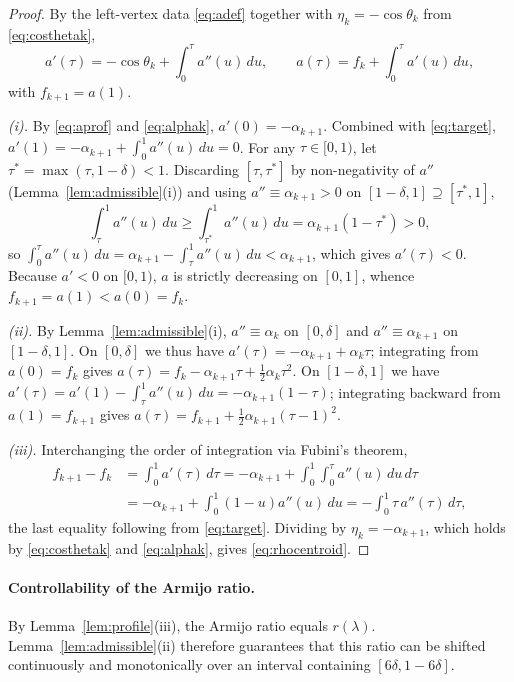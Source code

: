 \documentclass[11pt]{article}
\begin{document}
\begin{proof}
By the left-vertex data \eqref{eq:adef} together with $\eta_k=-\cos\theta_k$ from \eqref{eq:costhetak},
\begin{equation}
\label{eq:aprof}
a'(\tau) = -\cos\theta_k + \int_0^\tau a''(u)\,du, \qquad
a(\tau) = f_k + \int_0^\tau a'(u)\,du,
\end{equation}
with $f_{k+1}=a(1)$.

\emph{(i).} By \eqref{eq:aprof} and \eqref{eq:alphak}, $a'(0)=-\alpha_{k+1}$. Combined with \eqref{eq:target}, $a'(1)=-\alpha_{k+1}+\int_0^1 a''(u)\,du=0$. For any $\tau\in[0,1)$, let $\tau^*=\max(\tau,1-\delta)<1$. Discarding $[\tau,\tau^*]$ by non-negativity of $a''$ (Lemma~\ref{lem:admissible}(i)) and using $a''\equiv\alpha_{k+1}>0$ on $[1-\delta,1]\supseteq[\tau^*,1]$,
\[
\int_\tau^1 a''(u)\,du \ge \int_{\tau^*}^1 a''(u)\,du = \alpha_{k+1}(1-\tau^*) > 0,
\]
so $\int_0^\tau a''(u)\,du = \alpha_{k+1} - \int_\tau^1 a''(u)\,du < \alpha_{k+1}$, which gives $a'(\tau)<0$. Because $a'<0$ on $[0,1)$, $a$ is strictly decreasing on $[0,1]$, whence $f_{k+1}=a(1)<a(0)=f_k$.

\emph{(ii).} By Lemma~\ref{lem:admissible}(i), $a''\equiv\alpha_k$ on $[0,\delta]$ and $a''\equiv\alpha_{k+1}$ on $[1-\delta,1]$. On $[0,\delta]$ we thus have $a'(\tau)=-\alpha_{k+1}+\alpha_k\tau$; integrating from $a(0)=f_k$ gives $a(\tau)=f_k-\alpha_{k+1}\tau+\tfrac12\alpha_k\tau^2$. On $[1-\delta,1]$ we have $a'(\tau)=a'(1)-\int_\tau^1 a''(u)\,du=-\alpha_{k+1}(1-\tau)$; integrating backward from $a(1)=f_{k+1}$ gives $a(\tau)=f_{k+1}+\tfrac12\alpha_{k+1}(\tau-1)^2$.

\emph{(iii).} Interchanging the order of integration via Fubini's theorem,
\begin{align*}
f_{k+1}-f_k
&=\int_0^1 a'(\tau)\,d\tau
=-\alpha_{k+1}+\int_0^1\!\!\int_0^\tau a''(u)\,du\,d\tau \\
&=-\alpha_{k+1}+\int_0^1(1-u)a''(u)\,du
=-\int_0^1\tau\,a''(\tau)\,d\tau,
\end{align*}
the last equality following from \eqref{eq:target}. Dividing by $\eta_k=-\alpha_{k+1}$, which holds by \eqref{eq:costhetak} and \eqref{eq:alphak}, gives \eqref{eq:rhocentroid}.
\end{proof}

\paragraph{Controllability of the Armijo ratio.}
By Lemma~\ref{lem:profile}(iii), the Armijo ratio equals $r(\lambda)$. Lemma~\ref{lem:admissible}(ii) therefore guarantees that this ratio can be shifted continuously and monotonically over an interval containing $[6\delta, 1-6\delta]$.
\end{document}
